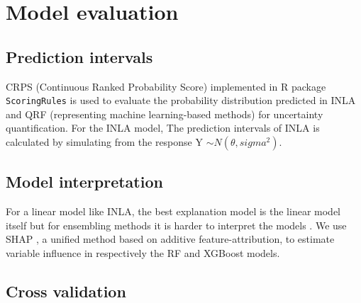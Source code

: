 \documentclass{article}
\begin{document}
\section{Model evaluation}

\subsection {Prediction intervals}

CRPS (Continuous Ranked Probability Score) implemented in R package {\tt ScoringRules} \citep{jordan2017evaluating} is used to evaluate the probability distribution predicted in INLA and QRF (representing machine learning-based methods) for uncertainty quantification. For the INLA model, The prediction intervals of INLA is calculated by simulating from the response Y $\sim N(\theta, sigma^2)$. 
 
 


 
\subsection{Model interpretation}
For a linear model like INLA, the best explanation model is the linear model itself but for ensembling methods it is harder to interpret the models \citep{NIPS2017_8a20a862}. We use SHAP \citep[SHapley Additive exPlanations,][]{lundberg2018explainable,NIPS2017_8a20a862}, a unified method based on additive feature-attribution, to estimate variable influence in respectively the RF and XGBoost models.   

\subsection{Cross validation}
\end{document}
